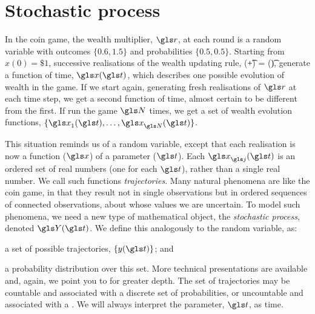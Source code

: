 \section{Stochastic process}
In the coin game, the wealth multiplier, $\gr$, at each round is a random variable with outcomes $\{0.6,1.5\}$ and probabilities $\{0.5,0.5\}$. Starting from $x(0)=\$1$, successive realisations of the wealth updating rule,
\be
\x(\t+\dt) = \x(\t)\gr,
\ee
generate a function of time, $\x(\t)$, which describes one possible evolution of wealth in the game. If we start again, generating fresh realisations of $\gr$ at each time step, we get a second function of time, almost certain to be different from the first. If run the game $\N$ times, we get a set of wealth evolution functions, $\{\x_1(\t),\dots,\x_{\N}(\t)\}$.

This situation reminds us of a random variable, except that each realisation is now a function 
($\x$) of a parameter ($\t$). Each $\x_\gj(\t)$ is an ordered set of real numbers (one for each 
$\t$), rather than a single real number. We call such functions \textit{trajectories}. Many natural 
phenomena are like the coin game, in that they result not in single observations but in ordered 
sequences of connected observations, about whose values we are uncertain. To model such 
phenomena, we need a new type of mathematical object, the \textit{stochastic process}, 
denoted $\Y(\t)$. We define this analogously to the random variable, as:
\bi
\item a set of possible trajectories, $\{y(\t)\}$; and
\item a probability distribution over this set.
\ei
More technical presentations are available and, again, we point you to \cite[p.~52]{vanKampen1992} 
for greater depth. The set of trajectories may be countable and associated with a discrete 
set of probabilities, or uncountable and associated with a \PDFa. 
We will always interpret 
the parameter, $\t$, as time.

